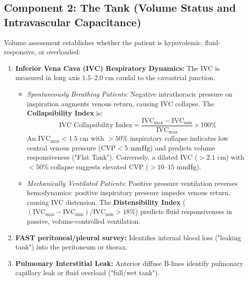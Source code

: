 \documentclass[11pt,a4paper]{article}
\begin{document}
\subsection{Component 2: The Tank (Volume Status and Intravascular Capacitance)}
Volume assessment establishes whether the patient is hypovolemic, fluid-responsive, or overloaded:
\begin{enumerate}[leftmargin=2em]
    \item \textbf{Inferior Vena Cava (IVC) Respiratory Dynamics:}
    The IVC is measured in long axis $1.5\text{--}2.0\text{ cm}$ caudal to the cavoatrial junction.
    \begin{itemize}
        \item \textit{Spontaneously Breathing Patients:} Negative intrathoracic pressure on inspiration augments venous return, causing IVC collapse. The \textbf{Collapsibility Index} is:
        \begin{equation}
            \text{IVC Collapsibility Index} = \frac{\text{IVC}_{\text{max}} - \text{IVC}_{\text{min}}}{\text{IVC}_{\text{max}}} \times 100\%
        \end{equation}
        An $\text{IVC}_{\text{max}} < 1.5\text{ cm}$ with $> 50\%$ inspiratory collapse indicates low central venous pressure ($\text{CVP} < 5\text{ mmHg}$) and predicts volume responsiveness ("Flat Tank"). Conversely, a dilated IVC ($> 2.1\text{ cm}$) with $< 50\%$ collapse suggests elevated CVP ($> 10\text{--}15\text{ mmHg}$).
        \item \textit{Mechanically Ventilated Patients:} Positive pressure ventilation reverses hemodynamics: positive inspiratory pressure impedes venous return, causing IVC distension. The \textbf{Distensibility Index} ($(\text{IVC}_{\text{max}} - \text{IVC}_{\text{min}})/\text{IVC}_{\text{min}} > 18\%$) predicts fluid responsiveness in passive, volume-controlled ventilation.
    \end{itemize}
    \item \textbf{FAST peritoneal/pleural survey:} Identifies internal blood loss ("leaking tank") into the peritoneum or thorax.
    \item \textbf{Pulmonary Interstitial Leak:} Anterior diffuse B-lines identify pulmonary capillary leak or fluid overload ("full/wet tank").
\end{enumerate}
\end{document}
